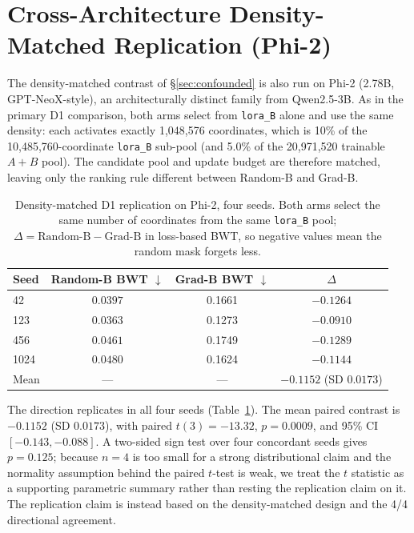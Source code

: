 \section{Cross-Architecture Density-Matched Replication (Phi-2)}
\label{app:phi2_d1}

The density-matched contrast of \S\ref{sec:confounded} is also run on Phi-2 (2.78B, GPT-NeoX-style), an architecturally distinct family from Qwen2.5-3B. As in the primary D1 comparison, both arms select from \texttt{lora\_B} alone and use the same density: each activates exactly 1{,}048{,}576 coordinates, which is 10\% of the 10{,}485{,}760-coordinate \texttt{lora\_B} sub-pool (and 5.0\% of the 20{,}971{,}520 trainable $A{+}B$ pool). The candidate pool and update budget are therefore matched, leaving only the ranking rule different between Random-B and Grad-B.

\begin{table}[t]
\caption{Density-matched D1 replication on Phi-2, four seeds. Both arms select the same number of coordinates from the same \texttt{lora\_B} pool; $\Delta=\text{Random-B}-\text{Grad-B}$ in loss-based BWT, so negative values mean the random mask forgets less.}
\label{tab:phi2_d1}
\centering
\small
\begin{tabular}{@{}lccc@{}}
\toprule
\textbf{Seed} & \textbf{Random-B BWT $\downarrow$} & \textbf{Grad-B BWT $\downarrow$} & \textbf{$\Delta$} \\
\midrule
42   & $\mathbf{0.0397}$ & 0.1661 & $-0.1264$ \\
123  & $\mathbf{0.0363}$ & 0.1273 & $-0.0910$ \\
456  & $\mathbf{0.0461}$ & 0.1749 & $-0.1289$ \\
1024 & $\mathbf{0.0480}$ & 0.1624 & $-0.1144$ \\
\midrule
Mean & --- & --- & $-0.1152$ (SD $0.0173$) \\
\bottomrule
\end{tabular}
\end{table}

The direction replicates in all four seeds (Table~\ref{tab:phi2_d1}). The mean paired contrast is $-0.1152$ (SD $0.0173$), with paired $t(3)=-13.32$, $p=0.0009$, and 95\% CI $[-0.143,-0.088]$. A two-sided sign test over four concordant seeds gives $p=0.125$; because $n=4$ is too small for a strong distributional claim and the normality assumption behind the paired $t$-test is weak, we treat the $t$ statistic as a supporting parametric summary rather than resting the replication claim on it. The replication claim is instead based on the density-matched design and the 4/4 directional agreement.

